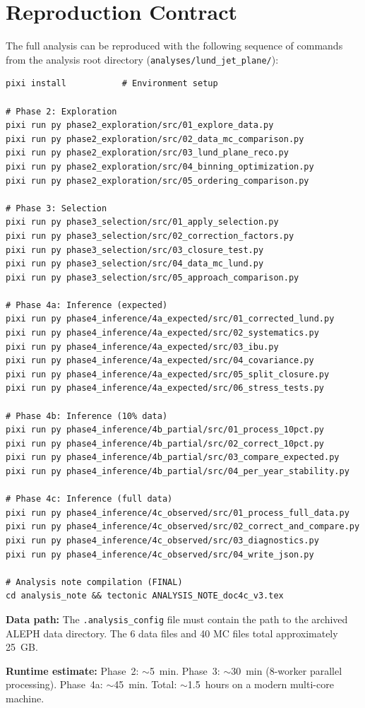 \documentclass[11pt,a4paper]{article}
\begin{document}
\section{Reproduction Contract}
\label{app:reproduction}

The full analysis can be reproduced with the following sequence of
commands from the analysis root directory
(\texttt{analyses/lund\_jet\_plane/}):

{\small
\begin{verbatim}
pixi install           # Environment setup

# Phase 2: Exploration
pixi run py phase2_exploration/src/01_explore_data.py
pixi run py phase2_exploration/src/02_data_mc_comparison.py
pixi run py phase2_exploration/src/03_lund_plane_reco.py
pixi run py phase2_exploration/src/04_binning_optimization.py
pixi run py phase2_exploration/src/05_ordering_comparison.py

# Phase 3: Selection
pixi run py phase3_selection/src/01_apply_selection.py
pixi run py phase3_selection/src/02_correction_factors.py
pixi run py phase3_selection/src/03_closure_test.py
pixi run py phase3_selection/src/04_data_mc_lund.py
pixi run py phase3_selection/src/05_approach_comparison.py

# Phase 4a: Inference (expected)
pixi run py phase4_inference/4a_expected/src/01_corrected_lund.py
pixi run py phase4_inference/4a_expected/src/02_systematics.py
pixi run py phase4_inference/4a_expected/src/03_ibu.py
pixi run py phase4_inference/4a_expected/src/04_covariance.py
pixi run py phase4_inference/4a_expected/src/05_split_closure.py
pixi run py phase4_inference/4a_expected/src/06_stress_tests.py

# Phase 4b: Inference (10% data)
pixi run py phase4_inference/4b_partial/src/01_process_10pct.py
pixi run py phase4_inference/4b_partial/src/02_correct_10pct.py
pixi run py phase4_inference/4b_partial/src/03_compare_expected.py
pixi run py phase4_inference/4b_partial/src/04_per_year_stability.py

# Phase 4c: Inference (full data)
pixi run py phase4_inference/4c_observed/src/01_process_full_data.py
pixi run py phase4_inference/4c_observed/src/02_correct_and_compare.py
pixi run py phase4_inference/4c_observed/src/03_diagnostics.py
pixi run py phase4_inference/4c_observed/src/04_write_json.py

# Analysis note compilation (FINAL)
cd analysis_note && tectonic ANALYSIS_NOTE_doc4c_v3.tex
\end{verbatim}
}

\textbf{Data path:} The \texttt{.analysis\_config} file must contain
the path to the archived ALEPH data directory.  The 6 data files and
40 MC files total approximately 25~GB.

\textbf{Runtime estimate:} Phase~2: $\sim$5~min.  Phase~3: $\sim$30~min
(8-worker parallel processing).  Phase~4a: $\sim$45~min.  Total:
$\sim$1.5~hours on a modern multi-core machine.
\end{document}
